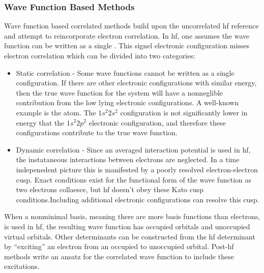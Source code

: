 \subsubsection{Wave Function Based Methods}
Wave function based correlated methods build upon  the uncorrelated \gls{hf} reference and attempt to reincorporate electron correlation.
In \gls{hf}, one assumes the wave function can be written as a single .
This signel electronic configuration misses electron correlation which can be divided into two categories:
\begin{itemize}
\item Static correlation - Some wave functions cannot be written as a single configuration. If there are other electronic configurations with similar energy, then the true wave function for the system will have a nonneglible contribution from the low lying electronic configurations. A well-known example is the  atom. The $1s^2 2s^2$ configuration is not significantly lower in energy that the $1s^2 2p^2$ electronic configuration, and therefore these configurations contribute to the true wave function.

\item Dynamic correlation - Since an averaged interaction potential is used in \gls{hf}, the instataneous interactions between electrons are neglected. In a time indepenedent picture this is manifested by a poorly resolved electron-electron cusp. Exact conditions exist for the functional form of the wave function as two electrons collaesce, but \gls{hf} doesn't obey these Kato cusp conditions.\citehere Including additional electronic configurations can resolve this cusp.
\end{itemize}

When a nonminimal basis, meaning there are more basis functions than electrons, is used in \gls{hf}, the resulting wave function has occupied orbitals and unoccupied virtual orbitals.
Other determinants can be constructed from the \gls{hf} determinant by ``exciting'' an electron from an occupied to unoccupied orbital.
Post-\gls{hf} methods write an ansatz for the correlated wave function to include these excitations.

